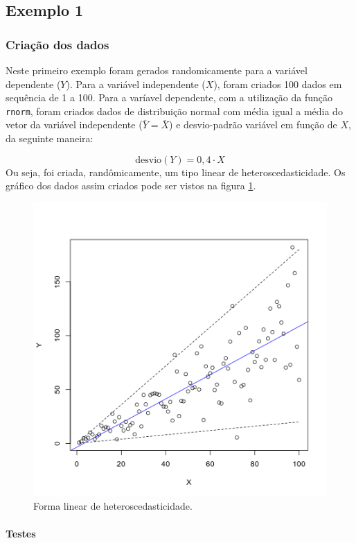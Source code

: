 \documentclass[a4paper, 12pt]{article}
\let\oldparagraph\paragraph
\renewcommand{\paragraph}[1]{\oldparagraph{#1}\mbox{}}
\let\code=\texttt
\begin{document}
\hypertarget{exemplo-1}{%
\subsection{Exemplo 1}\label{exemplo-1}}

\hypertarget{criacao-dos-dados}{%
\subsubsection{Criação dos dados}\label{criacao-dos-dados}}

Neste primeiro exemplo foram gerados randomicamente para a variável
dependente (\(Y\)). Para a variável independente (\(X\)), foram criados
100 dados em sequência de 1 a 100. Para a varíavel dependente, com a
utilização da função \code{rnorm}, foram criados dados de distribuição
normal com média igual a média do vetor da variável independente
(\(\bar{Y} = \bar{X}\)) e desvio-padrão variável em função de \(X\), da
seguinte maneira:

\[\mathrm{desvio}(Y) = 0,4 \cdot X\] Ou seja, foi criada,
randômicamente, um tipo linear de heteroscedasticidade. Os gráfico dos
dados assim criados pode ser vistos na figura \ref{fig:hetero}.

\begin{figure}[H]

{\centering \includegraphics[width=0.6\linewidth]{images/hetero-1} 

}

\caption{Forma linear de heteroscedasticidade.}\label{fig:hetero}
\end{figure}

\hypertarget{testes}{%
\paragraph{Testes}\label{testes}}
\end{document}
